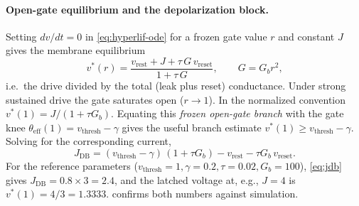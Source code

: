 \documentclass[11pt]{article}
\newcommand{\vth}{v_{\mathrm{thresh}}}
\newcommand{\vr}{v_{\mathrm{rest}}}
\newcommand{\vre}{v_{\mathrm{reset}}}
\newcommand{\teff}{\theta_{\mathrm{eff}}}
\newcommand{\Gb}{G_{b}}
\newcommand{\Jdb}{J_{\mathrm{DB}}}
\begin{document}
\paragraph{Open-gate equilibrium and the depolarization block.}
Setting $dv/dt=0$ in \cref{eq:hyperlif-ode} for a frozen gate value $r$ and
constant $J$ gives the membrane equilibrium
\begin{equation}
  v^\ast(r) = \frac{\vr + J + \tau\,G\,\vre}{1 + \tau\,G}, \qquad G=\Gb r^2,
  \label{eq:vstar}
\end{equation}
i.e.\ the drive divided by the total (leak plus reset) conductance. Under strong
sustained drive the gate saturates open ($r\to 1$). In the normalized convention
$v^\ast(1)=J/(1+\tau\Gb)$. Equating this \emph{frozen open-gate branch}
with the gate knee $\teff(1)=\vth-\gamma$ gives the useful branch estimate
$v^\ast(1)\ge \vth-\gamma$. Solving for the corresponding current,
\begin{equation}
  \boxed{\;\Jdb = (\vth-\gamma)\,(1+\tau\Gb) - \vr - \tau\Gb\,\vre.\;}
  \label{eq:jdb}
\end{equation}
For the reference parameters ($\vth=1,\gamma=0.2,\tau=0.02,\Gb=100$),
\cref{eq:jdb} gives $\Jdb=0.8\times 3 = 2.4$, and the latched voltage at, e.g.,
$J=4$ is $v^\ast(1)=4/3=1.3333$.  confirms both numbers
against simulation.

\end{document}
